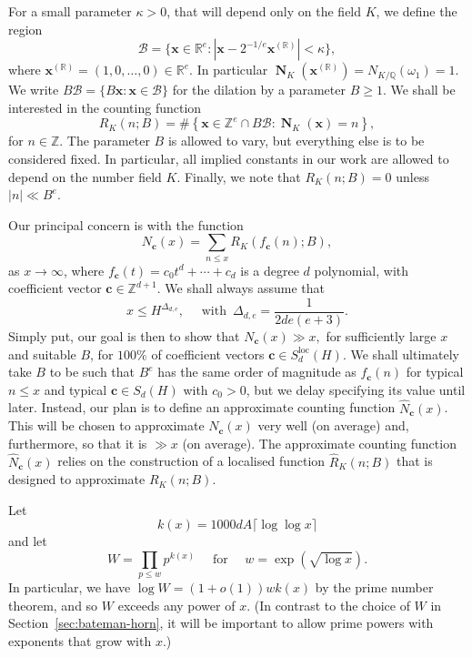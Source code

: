 \documentclass[11pt,letterpaper]{amsart}
\renewcommand{\leq}{\leqslant}
\renewcommand{\geq}{\geqslant}
\theoremstyle{definition}
\numberwithin{equation}{section}
\newcommand\RR{\mathbb{R}}
\newcommand\ZZ{\mathbb{Z}}
\newcommand\QQ{\mathbb{Q}}
\newcommand{\x}{\mathbf{x}}
\renewcommand{\c}{\mathbf{c}}
\DeclareMathOperator{\nf}{\mathbf{N}}
\newcommand{\0}{\mathbf{0}}
\begin{document}
For a small parameter  $\kappa>0$, that will depend only on the field $K$, we define the region
$$
\mathcal{B}=
\{\x \in \RR^e: |\x-2^{-1/e}\x^{(\RR)}|<\kappa \},
$$
where
$\x^{(\RR)}=(1,0,\dots,0)\in \mathbb{R}^e$. In particular $\nf_K(\x^{(\RR)})=N_{K/\QQ}(\omega_1)=1$.
We write $B\mathcal{B}=\{B\x:\x\in \mathcal{B}\}$ for the dilation by a parameter $B\geq 1$.
We shall be interested in the counting function
\begin{equation}\label{eq:define-R}
R_K(n;B)=\#\left\{\x\in \ZZ^e\cap B\mathcal{B}: \nf_K(\x)=n\right\},
\end{equation}
for $n\in \ZZ$.
The parameter $B$ is allowed to vary, but everything else is to be considered fixed. In particular, all implied constants in our work are allowed to depend on the number field $K$.
Finally, we note that  $R_K(n;B)=0$ unless $|n|\ll B^e$.



Our principal concern is with the function
$$
N_{\c}(x)=\sum_{n\leq x}  R_K(f_\c(n);B),
$$
as $x\to \infty$, where $f_\c(t)=c_0t^d+\cdots +c_d$ is a degree $d$ polynomial,
with coefficient vector $\c\in \ZZ^{d+1}$.
We  shall  always assume that 
\begin{equation}\label{eq:suff-small}
x\leq H^{\Delta_{d,e}}, \quad \text{ with }\, \Delta_{d,e}=\frac{1}{2de(e+3)}.
\end{equation}
Simply put,  our goal is then to show that 
$
N_\c(x)\gg x,
$ 
for sufficiently large $x$ and suitable $B$,  for $100\%$ of 
coefficient vectors $\c\in S_d^{\text{loc}}(H)$.
We  shall ultimately take $B$ to be such that $B^e$ has the same order of magnitude as $f_\c(n)$ for typical $n\leq x$ and typical $\c\in S_d(H)$ with $c_0>0$, but we delay  specifying its value until later.
Instead, our plan is to 
define an approximate counting function 
$\hat N_\c(x)$. This will be chosen to  approximate $N_\c(x)$ very well (on average) and, furthermore,  so that 
it is  $\gg x$ (on average).
The approximate counting function $\hat N_\c(x)$ 
relies on the construction of a localised function $\hat R_K(n;B)$
that is designed to   approximate $R_K(n;B)$. 

Let
\begin{equation}\label{eq:k-x}
k(x)=1000dA \lceil \log\log x\rceil
\end{equation}
and let 
\begin{equation}\label{eq:def_W}
W=\prod_{p\leq w} p^{k(x)}\quad \text{ for }\quad 
w=\exp(\sqrt{\log x}).
\end{equation}
In particular, we have $\log W =(1+o(1)) wk(x)$ by the prime number theorem, and so
$W$ exceeds any power of $x$.
(In contrast to the choice of $W$ in Section~\ref{sec:bateman-horn}, it will be important to allow prime powers with exponents that   grow with $x$.) 
\end{document}
